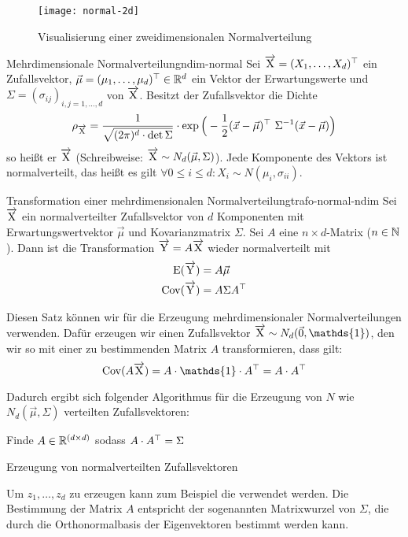 \begin{figure}[h!]
\centering
\texttt{[image: normal-2d]}
\caption{Visualisierung einer zweidimensionalen Normalverteilung}
\end{figure}

\begin{definition}{Mehrdimensionale Normalverteilung}{ndim-normal}
Sei $\overrightarrow{\mathrm{X}} = (X_1, \ldots,X_d)^\top$ ein Zufallsvektor,
$\vec{\mu} = (\mu_1, \ldots, \mu_d)^\top \in\mathbb{R}^d$ ein Vektor der
Erwartungswerte und $\Sigma = (\sigma_{ij})_{i,j=1,\ldots,d}$
 von $\overrightarrow{\mathrm{X}}$. Besitzt der
Zufallsvektor die Dichte
\[
\rho_{\zvec{X}} = \frac{1}{\sqrt{(2\pi)^d\cdot\det\Sigma}}\cdot
  \exp\Big(-\frac{1}{2}(\vec{x} - \vec{\mu})^\T\ \Sigma^{-1}(\vec{x}-\vec{\mu})\Big)
\]
so heißt er $\overrightarrow{\mathrm{X}}$  (Schreibweise: $\overrightarrow{\mathrm{X}}\sim
N_d(\vec\mu,\Sigma)$). Jede Komponente des Vektors ist normalverteilt, das heißt
es gilt $\forall 0\le i\le d: X_i \sim N(\mu_i,\sigma_{ii})$.
\end{definition}

\begin{theorem}{Transformation einer mehrdimensionalen
Normalverteilung}{trafo-normal-ndim}
Sei $\overrightarrow{\mathrm{X}}$ ein normalverteilter Zufallsvektor von $d$ Komponenten mit
Erwartungswertvektor $\vec\mu$ und Kovarianzmatrix $\Sigma$. Sei $A$ eine
$n\times d$-Matrix ($n\in\mathbb{N}$). Dann ist die Transformation $\overrightarrow{\mathrm{Y}}= A\overrightarrow{\mathrm{X}}$
wieder normalverteilt mit
\begin{align*}
\operatorname{E}(\overrightarrow{\mathrm{Y}}) &= A\vec\mu \\
\operatorname{Cov}(\overrightarrow{\mathrm{Y}}) &= A\Sigma A^\top
\end{align*}
\end{theorem}

Diesen Satz können wir für die Erzeugung mehrdimensionaler Normalverteilungen
verwenden. Dafür erzeugen wir einen Zufallsvektor $\zvec{X} \sim
N_d(\vec{0},\mathds{1})$,
den wir so mit einer zu bestimmenden Matrix $A$ transformieren, dass gilt:
\[
\Cov(A\zvec{X}) = A\cdot \mathds{1}\cdot A^\T = A\cdot A^\T
\]

Dadurch ergibt sich folgender Algorithmus für die Erzeugung von $N$
wie $N_d(\vec\mu, \Sigma)$ verteilten Zufallsvektoren:
\begin{algorithm}[h!]

Finde $A\in\mathbb{R}^{(d\times d)}$ sodass $A\cdot A^\top = \Sigma$\;


\caption{Erzeugung von normalverteilten Zufallsvektoren}
\label{algo:zz-normal-ndim}
\end{algorithm}

Um $z_1, \ldots, z_d$ zu erzeugen kann zum Beispiel die
 verwendet werden. Die Bestimmung
der Matrix $A$ entspricht der sogenannten Matrixwurzel von $\Sigma$, die durch
die Orthonormalbasis der Eigenvektoren bestimmt werden
kann.
